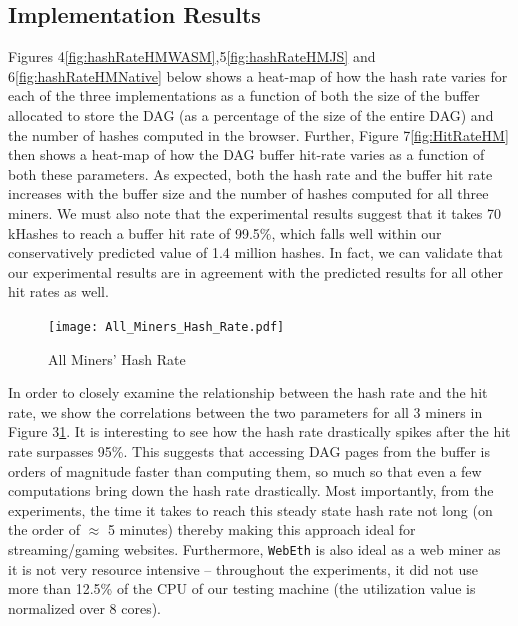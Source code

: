 \documentclass[runningheads]{llncs}
\begin{document}
\subsection{Implementation Results}
Figures 4\ref{fig:hashRateHMWASM},5\ref{fig:hashRateHMJS} and 6\ref{fig:hashRateHMNative} below shows a heat-map of how the hash rate varies for each of the three implementations as a function of both the size of the buffer allocated to store the DAG (as a percentage of the size of the entire DAG) and the number of hashes computed in the browser. Further, Figure 7\ref{fig:HitRateHM} then shows a heat-map of how the DAG buffer hit-rate varies as a function of both these parameters. 
As expected, both the hash rate and the buffer hit rate increases with the buffer size and the number of hashes computed for all three miners. We must also note that the experimental results suggest that it takes 70 kHashes to reach a buffer hit rate of 99.5\%, which falls well within our conservatively predicted value of 1.4 million hashes. In fact, we can validate that our experimental results are in agreement with the predicted results for all other hit rates as well.

\begin{figure}[h]
\centering
\texttt{[image: All\_Miners\_Hash\_Rate.pdf]}
\caption{All Miners' Hash Rate}
\label{fig:HashRateTraj} 
\end{figure}

\begin{figure}[t]
       \centering
\end{figure}

In order to closely examine the relationship between the hash rate and the hit rate, we show the correlations between the two parameters for all 3 miners in Figure 3\ref{fig:HashRateTraj}. It is interesting to see how the hash rate drastically spikes after the hit rate surpasses 95\%. This suggests that accessing DAG pages from the buffer is orders of magnitude faster than computing them, so much so that even a few computations bring down the hash rate drastically. Most importantly, from the experiments, the time it takes to reach this steady state hash rate not long (on the order of $\approx$ 5 minutes) thereby making this approach ideal for streaming/gaming websites. Furthermore, \verb|WebEth| is also ideal as a web miner as it is not very resource intensive -- throughout the experiments, it did not use more than 12.5\% of the CPU of our testing machine (the utilization value is normalized over 8 cores).
\end{document}
